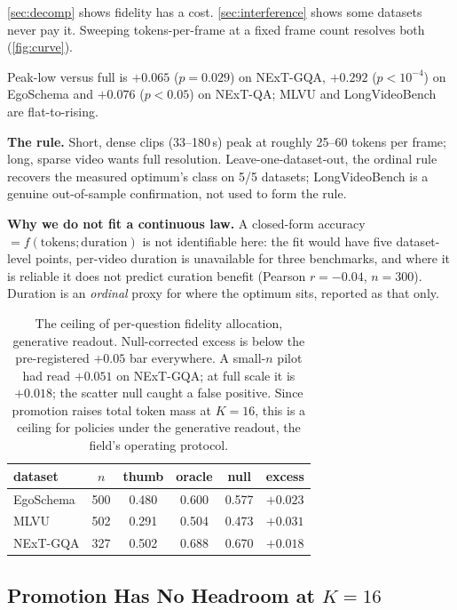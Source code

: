 \documentclass[10pt,twocolumn,letterpaper]{article}
\begin{document}
\cref{sec:decomp} shows fidelity has a cost. \cref{sec:interference} shows some datasets never pay it. Sweeping tokens-per-frame at a fixed frame count resolves both (\cref{fig:curve}).

Peak-low versus full is $+0.065$ ($p{=}0.029$) on NExT-GQA, $+0.292$ ($p{<}10^{-4}$) on EgoSchema and $+0.076$ ($p{<}0.05$) on NExT-QA; MLVU and LongVideoBench are flat-to-rising.

\noindent\textbf{The rule.} Short, dense clips (33--180\,s) peak at roughly 25--60 tokens per frame; long, sparse video wants full resolution. Leave-one-dataset-out, the ordinal rule recovers the measured optimum's class on 5/5 datasets; LongVideoBench is a genuine out-of-sample confirmation, not used to form the rule.

\noindent\textbf{Why we do not fit a continuous law.} A closed-form accuracy $= f(\text{tokens};\text{duration})$ is not identifiable here: the fit would have five dataset-level points, per-video duration is unavailable for three benchmarks, and where it is reliable it does not predict curation benefit (Pearson $r{=}-0.04$, $n{=}300$). Duration is an \emph{ordinal} proxy for where the optimum sits, reported as that only.

\begin{table}[t]
\centering
\footnotesize
\begin{tabular}{lccccc}
\toprule
dataset & $n$ & thumb & oracle & null & excess\\
\midrule
EgoSchema & 500 & 0.480 & 0.600 & 0.577 & $+0.023$\\
MLVU & 502 & 0.291 & 0.504 & 0.473 & $+0.031$\\
NExT-GQA & 327 & 0.502 & 0.688 & 0.670 & $+0.018$\\
\bottomrule
\end{tabular}
\caption{The ceiling of per-question fidelity allocation, generative readout. Null-corrected excess is below the pre-registered $+0.05$ bar everywhere. A small-$n$ pilot had read $+0.051$ on NExT-GQA; at full scale it is $+0.018$; the scatter null caught a false positive. Since promotion raises total token mass at $K{=}16$, this is a ceiling for policies under the generative readout, the field's operating protocol.}
\label{tab:oracle}
\end{table}

\subsection{Promotion Has No Headroom at $K{=}16$}
\label{sec:promotion}
\end{document}
